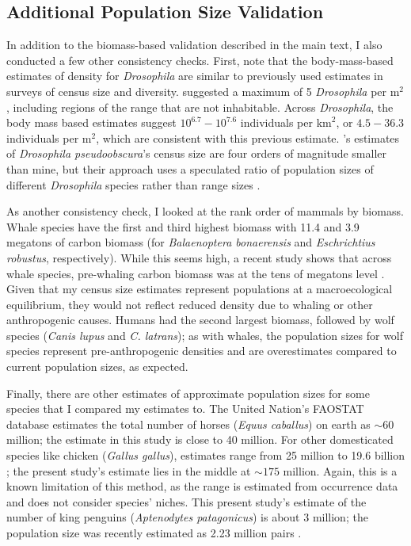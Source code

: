 \documentclass[9pt,lineno]{elife}
\begin{document}
\begin{appendixbox}

\section{Additional Population Size Validation}
\label{app:popsize-valid}

In addition to the biomass-based validation described in the main text, I also
conducted a few other consistency checks. First, note that the body-mass-based
estimates of density for \emph{Drosophila} are similar to previously used
estimates in surveys of census size and diversity. \cite{Nei1984-zi}
suggested a maximum of 5 \emph{Drosophila} per $\text{m}^2$, including regions
of the range that are not inhabitable. Across \emph{Drosophila}, the body mass
based estimates suggest $10^{6.7}-10^{7.6}$ individuals per $\text{km}^2$, or
$4.5-36.3$ individuals per $\text{m}^2$, which are consistent with this
previous estimate.  \citeauthor{Nei1984-zi}'s estimates of \emph{Drosophila
pseudoobscura}'s census size are four orders of magnitude smaller than mine,
but their approach uses a speculated ratio of population sizes of different
\emph{Drosophila} species rather than range sizes \citep[p.
81]{Nei1984-zi}.

As another consistency check, I looked at the rank order of mammals by biomass.
Whale species have the first and third highest biomass with 11.4 and 3.9
megatons of carbon biomass (for \emph{Balaenoptera bonaerensis} and
\emph{Eschrichtius robustus}, respectively). While this seems high, a recent
study shows that across whale species, pre-whaling carbon biomass was at the
tens of megatons level \citep[Table 1 and Figure 1]{Pershing2010-fh}.
Given that my census size estimates represent populations at a macroecological
equilibrium, they would not reflect reduced density due to whaling or other
anthropogenic causes. Humans had the second largest biomass, followed by wolf
species (\emph{Canis lupus} and \emph{C. latrans}); as with whales, the
population sizes for wolf species represent pre-anthropogenic densities and are
overestimates compared to current population sizes, as expected. 

Finally, there are other estimates of approximate population sizes for some
species that I compared my estimates to. The United Nation's FAOSTAT database
estimates the total number of horses (\emph{Equus caballus}) on earth as
$\mathord{\sim}60$ million; the estimate in this study is close to 40 million.
For other domesticated species like chicken (\emph{Gallus gallus}), estimates
range from 25 million to 19.6 billion
\citep{noauthor_2021-gc,Robinson2014-sx}; the present study's estimate lies
in the middle at $\mathord{\sim}175$ million. Again, this is a known limitation
of this method, as the range is estimated from occurrence data and does not
consider species' niches. This present study's estimate of the number of king
penguins (\emph{Aptenodytes patagonicus}) is about 3 million; the population
size was recently estimated as 2.23 million pairs \citep{Shirihai2008-ft}.

\end{appendixbox}
\end{document}
